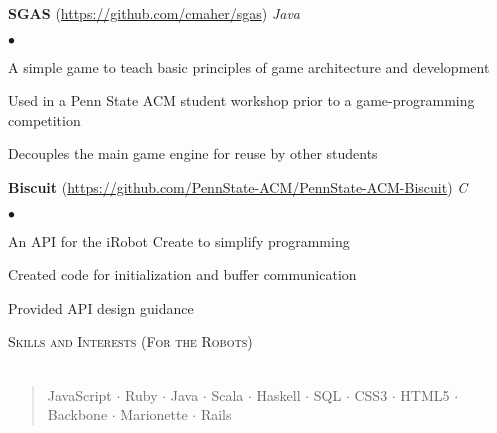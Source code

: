 \documentclass{article}
\newcommand{\skill}[1]{\begin{verse}#1\end{verse} }
\newcommand{\lineunder}{\vspace*{-8pt} \\ \hspace*{-18pt} \hrulefill \\}
\newcommand{\header}[1]{{\hspace*{-15pt}\vspace*{6pt} \textsc{#1}} \vspace*{-6pt} \lineunder}
\newcommand{\project}[3]{{ \textbf{#1} (\url{#2}) \hfill \textit{#3} \\ }}
\newenvironment{achievements}{\begin{list}{$\bullet$}{\topsep 0pt \itemsep -2pt}}{\vspace*{4pt}\end{list}}
\begin{document}
\project{SGAS}{https://github.com/cmaher/sgas}{Java}
    \begin{achievements}
    \item A simple game to teach basic principles of game architecture and development
    \item Used in a Penn State ACM student workshop prior to a game-programming competition
    \item Decouples the main game engine for reuse by other students
    \end{achievements}


\project{Biscuit}{https://github.com/PennState-ACM/PennState-ACM-Biscuit}{C}
    \begin{achievements}
    \item An API for the iRobot Create to simplify programming
    \item Created code for initialization and buffer communication
    \item Provided API design guidance
    \end{achievements}

\header{Skills and Interests (For the Robots)}
    \skill{JavaScript $\cdot$ Ruby $\cdot$ Java $\cdot$ Scala $\cdot$ Haskell
      $\cdot$ SQL $\cdot$ CSS3 $\cdot$ HTML5 $\cdot$ Backbone $\cdot$ Marionette
      $\cdot$ Rails }
\end{document}
